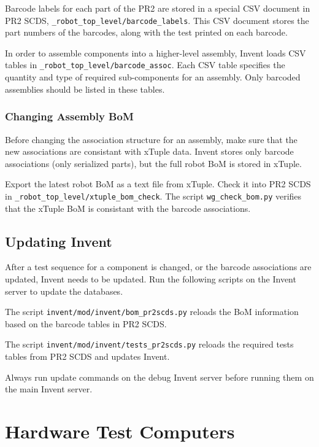 \documentclass[11pt]{book}
\begin{document}
Barcode labels for each part of the PR2 are stored in a special CSV document in PR2 SCDS, \texttt{\_robot\_top\_level/barcode\_labels}. This CSV document stores the part numbers of the barcodes, along with the test printed on each barcode. 

In order to assemble components into a higher-level assembly, Invent loads CSV tables in \texttt{\_robot\_top\_level/barcode\_assoc}. Each CSV table specifies the quantity and type of required sub-components for an assembly. Only barcoded assemblies should be listed in these tables.


\subsection{Changing Assembly BoM}

Before changing the association structure for an assembly, make sure that the new associations are consistant with xTuple data. Invent stores only barcode associations (only serialized parts), but the full robot BoM is stored in xTuple.

Export the latest robot BoM as a text file from xTuple. Check it into PR2 SCDS in \texttt{\_robot\_top\_level/xtuple\_bom\_check}. The script \texttt{wg\_check\_bom.py} verifies that the xTuple BoM is consistant with the barcode associations.

\section{Updating Invent}

After a test sequence for a component is changed, or the barcode associations are updated, Invent needs to be updated. Run the following scripts on the Invent server to update the databases.

The script \texttt{invent/mod/invent/bom\_pr2scds.py} reloads the BoM information based on the barcode tables in PR2 SCDS. 

The script \texttt{invent/mod/invent/tests\_pr2scds.py} reloads the required tests tables from PR2 SCDS and updates Invent.

Always run update commands on the debug Invent server before running them on the main Invent server.





\chapter{Hardware Test Computers}
\end{document}

